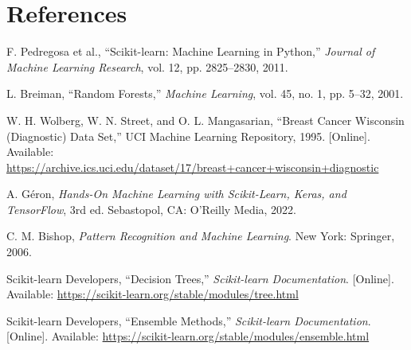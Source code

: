 \documentclass[11pt,a4paper]{article}
\begin{document}
\section{References}
\begin{enumerate}[label={[\arabic*]}]
\item F. Pedregosa et al., ``Scikit-learn: Machine Learning in Python,'' \emph{Journal of Machine Learning Research}, vol. 12, pp. 2825--2830, 2011.
\item L. Breiman, ``Random Forests,'' \emph{Machine Learning}, vol. 45, no. 1, pp. 5--32, 2001.
\item W. H. Wolberg, W. N. Street, and O. L. Mangasarian, ``Breast Cancer Wisconsin (Diagnostic) Data Set,'' UCI Machine Learning Repository, 1995. [Online]. Available: \url{https://archive.ics.uci.edu/dataset/17/breast+cancer+wisconsin+diagnostic}
\item A. G\'eron, \emph{Hands-On Machine Learning with Scikit-Learn, Keras, and TensorFlow}, 3rd ed. Sebastopol, CA: O'Reilly Media, 2022.
\item C. M. Bishop, \emph{Pattern Recognition and Machine Learning}. New York: Springer, 2006.
\item Scikit-learn Developers, ``Decision Trees,'' \emph{Scikit-learn Documentation}. [Online]. Available: \url{https://scikit-learn.org/stable/modules/tree.html}
\item Scikit-learn Developers, ``Ensemble Methods,'' \emph{Scikit-learn Documentation}. [Online]. Available: \url{https://scikit-learn.org/stable/modules/ensemble.html}
\end{enumerate}
\end{document}
